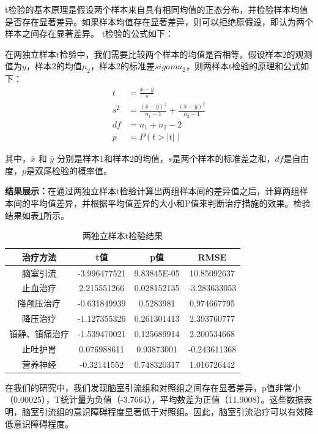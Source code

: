 \documentclass[bwprint]{gmcmthesis}
\begin{document}
t检验的基本原理是假设两个样本来自具有相同均值的正态分布，并检验样本均值是否存在显著差异。如果样本均值存在显著差异，则可以拒绝原假设，即认为两个样本之间存在显著差异。 t检验的公式如下：

在两独立样本t检验中，我们需要比较两个样本的均值是否相等。假设样本2的观测值为$y$，样本2的均值$μ_2$，样本2的标准差$sigama_2$，则两样本t检验的原理和公式如下：
\begin{align}
t &= \frac{\bar{x} - \bar{y}}{s} \\
s^2 &= \frac{(\bar{x} - \bar{y})^2}{n_1-1} + \frac{(\bar{x} - \bar{y})^2}{n_2-1} \\
df &= n_1 + n_2 - 2 \\
p &= P(t > |t|) \
\end{align}

其中，$\bar{x}$ 和 $\bar{y}$ 分别是样本1和样本2的均值，$s$是两个样本的标准差之和，$d f$是自由度，$p$是双尾检验的概率值。

{\bf 结果展示：}在通过两独立样本t检验计算出两组样本间的差异值之后，计算两组样本间的平均值差异，并根据平均值差异的大小和P值来判断治疗措施的效果。检验结果如表\ref{tab:t检验}所示。
\begin{table}[ht]
\centering
\caption{两独立样本t检验结果}
\label{tab:t检验}
\fontsize{11}{9}\selectfont
\renewcommand\tabcolsep{6pt}
{

\begin{tabular}{cccc}
\toprule[1.2pt]
治疗方法    & t值           & p值          & RMSE         \\ \hline
脑室引流    & -3.996477521 & 9.83845E-05 & 10.85092637  \\
止血治疗    & 2.215551266  & 0.028152135 & -3.283633053 \\
降颅压治疗   & -0.631849939 & 0.5283981   & 0.974667795  \\
降压治疗    & -1.127355326 & 0.261301413 & 2.393760777  \\
镇静、镇痛治疗 & -1.539470021 & 0.125689914 & 2.200534668  \\
止吐护胃    & 0.076988611  & 0.93873001  & -0.243611368 \\
营养神经    & -0.32141552  & 0.748320317 & 1.016726442  \\ \bottomrule[1.2pt]
\end{tabular}}
\end{table}

在我们的研究中，我们发现脑室引流组和对照组之间存在显著差异，p值非常小（0.00025），T统计量为负值（-3.7664），平均数差为正值（11.9008）。这些数据表明，脑室引流组的意识障碍程度显著低于对照组。因此，脑室引流治疗可以有效降低意识障碍程度。
\end{document}
